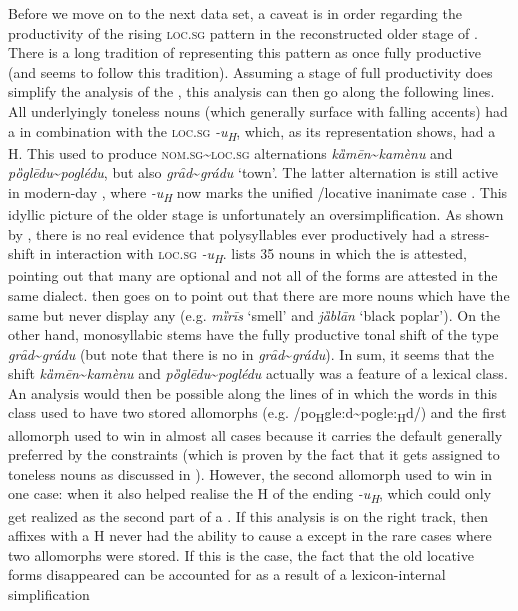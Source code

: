 \documentclass[output=paper,nonflat,colorlinks,citecolor=brown,newtxmath]{langsci/langscibook}
\begin{document}
Before we move on to the next data set, a caveat is in order regarding the productivity of the rising \textsc{loc}.\textsc{sg} pattern in the reconstructed older stage of . There is a long tradition of representing this pattern as once fully productive (and \citeauthor{Klaic2013} seems to follow this tradition). Assuming a stage of full productivity does simplify the analysis of the , this analysis can then go along the following lines. All underlyingly toneless nouns (which generally surface with falling accents) had a  in combination with the \textsc{loc}.\textsc{sg} \textit{-u\textsubscript{H}}, which, as its representation shows, had a H. This used to produce \textsc{nom}.\textsc{sg}\textasciitilde{}\textsc{loc}.\textsc{sg} alternations \textit{kȁmēn}\textasciitilde{}\textit{kamènu} and \textit{pȍglēdu}\textasciitilde{}\textit{poglédu}, but also \textit{grȃd}\textasciitilde{}\textit{grád}\textit{u} `town'. The latter alternation is still active in modern-day , where \textit{-u\textsubscript{H}} now marks the unified /locative inanimate case \citep{SimonovicArsenijevic2015a}. This idyllic picture of the older stage is unfortunately an oversimplification. As shown by \citet[219--220]{Stevanovic1979}, there is no real evidence that polysyllables ever productively had a stress-shift in interaction with \textsc{loc}.\textsc{sg} \textit{-u\textsubscript{H}}. \citeauthor{Stevanovic1979} lists 35 nouns in which the  is attested, pointing out that many are optional and not all of the forms are attested in the same dialect. \citeauthor{Stevanovic1979} then goes on to point out that there are more nouns which have the same  but never display any  (e.g. \textit{mȉrīs} `smell' and \textit{jȁblān} `black poplar’). On the other hand, monosyllabic stems have the fully productive tonal  shift of the type \textit{grȃd}\textasciitilde{}\textit{grádu} (but note that there is no  in \textit{grȃd}\textasciitilde{}\textit{grádu}). In sum, it seems that the shift \textit{kȁmēn}\textasciitilde{}\textit{kamènu} and \textit{pȍglēdu}\textasciitilde{}\textit{poglédu} actually was a feature of a lexical class. An analysis would then be possible along the lines of \citet{Kager2008} in which the words in this class used to have two stored allomorphs (e.g. /po\textsubscript{H}gle:d\textasciitilde{}pogle:\textsubscript{H}d/) and the first allomorph used to win in almost all cases because it carries the default  generally preferred by the  constraints (which is proven by the fact that it gets assigned to toneless nouns as discussed in ). However, the second allomorph used to win in one case: when it also helped realise the H of the ending \textit{-u\textsubscript{H}}, which could only get realized as the second part of a . If this analysis is on the right track, then  affixes with a H never had the ability to cause a  except in the rare cases where two allomorphs were stored. If this is the case, the fact that the old locative forms disappeared can be accounted for as a result of a lexicon-internal simplification 
\end{document}
